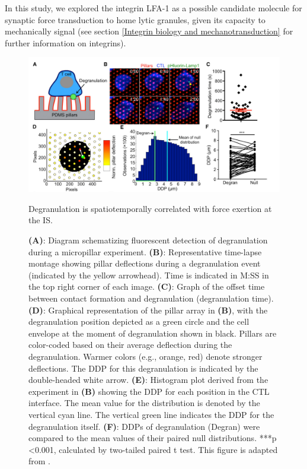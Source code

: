 In this study, we explored the integrin LFA-1 as a possible candidate molecule for synaptic force transduction to home lytic granules, given its capacity to mechanically signal (see section \ref{Integrin biology and mechanotransduction} for further information on integrins).

\begin{figure}[htbp]
	\centering
	\includegraphics[width=\textwidth]{../figures/chapter3/introddp.png}
	\caption{Degranulation is spatiotemporally correlated with force exertion at the IS.}
	\caption*{\textbf{(A)}: Diagram schematizing fluorescent detection of degranulation during a micropillar experiment. \textbf{(B)}: Representative time-lapse montage showing pillar deflections during a degranulation event (indicated by the yellow arrowhead). Time is indicated in M:SS in the top right corner of each image. \textbf{(C)}: Graph of the offset time between contact formation and degranulation (degranulation time).  \textbf{(D)}: Graphical representation of the pillar array in \textbf{(B)}, with the degranulation position depicted as a green circle and the cell envelope at the moment of degranulation shown in black. Pillars are color-coded based on their average deflection during the degranulation. Warmer colors (e.g., orange, red) denote stronger deflections. The DDP for this degranulation is indicated by the double-headed white arrow. \textbf{(E)}: Histogram plot derived from the experiment in \textbf{(B)} showing the DDP for each position in the CTL interface. The mean value for the distribution is denoted by the vertical cyan line. The vertical green line indicates the DDP for the degranulation itself.  \textbf{(F)}: DDPs of degranulation (Degran) were compared to the mean values of their paired null distributions. ***p \textless 0.001, calculated by two-tailed paired t test.  This figure is adapted from \cite{Basu2016}.}
	\label{fig:introddp}
\end{figure}

